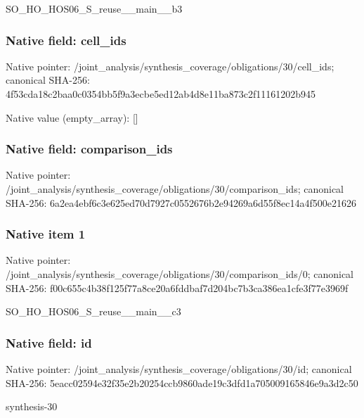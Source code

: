 \documentclass[10pt,a4paper]{article}
\begin{document}
\begingroup\raggedright\sloppy SO\_\allowbreak{}HO\_\allowbreak{}HOS06\_\allowbreak{}S\_\allowbreak{}reuse\_\allowbreak{}\_\allowbreak{}main\_\allowbreak{}\_\allowbreak{}b3\par\endgroup

\subsubsection{Native field: cell\_\allowbreak{}ids}
Native pointer: /joint\_\allowbreak{}analysis/synthesis\_\allowbreak{}coverage/obligations/30/cell\_\allowbreak{}ids; canonical SHA-256: 4f53cda18c2baa0c0354bb5f9a3ecbe5ed12ab4d8e11ba873c2f11161202b945

Native value (empty\_\allowbreak{}array): []

\subsubsection{Native field: comparison\_\allowbreak{}ids}
Native pointer: /joint\_\allowbreak{}analysis/synthesis\_\allowbreak{}coverage/obligations/30/comparison\_\allowbreak{}ids; canonical SHA-256: 6a2ea4ebf6c3e625ed70d7927c0552676b2e94269a6d55f8ec14a4f500e21626

\subsubsection{Native item 1}
Native pointer: /joint\_\allowbreak{}analysis/synthesis\_\allowbreak{}coverage/obligations/30/comparison\_\allowbreak{}ids/0; canonical SHA-256: f00c655c4b38f125f77a8ce20a6fddbaf7d204bc7b3ca386ea1cfe3f77e3969f

\begingroup\raggedright\sloppy SO\_\allowbreak{}HO\_\allowbreak{}HOS06\_\allowbreak{}S\_\allowbreak{}reuse\_\allowbreak{}\_\allowbreak{}main\_\allowbreak{}\_\allowbreak{}c3\par\endgroup

\subsubsection{Native field: id}
Native pointer: /joint\_\allowbreak{}analysis/synthesis\_\allowbreak{}coverage/obligations/30/id; canonical SHA-256: 5eacc02594e32f35e2b20254ccb9860ade19c3dfd1a705009165846e9a3d2c50

\begingroup\raggedright\sloppy synthesis-30\par\endgroup
\end{document}
